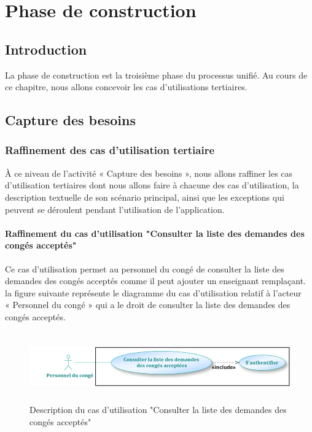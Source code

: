 \documentclass[12 pt]{report}
\begin{document}
\chapter{Phase de construction}
\section*{Introduction}  
La phase de construction est la troisième phase du processus unifié. Au cours de ce chapitre, nous allons concevoir les cas d’utilisations tertiaires.
\section{Capture des besoins}
\subsection{Raffinement des cas d’utilisation tertiaire}
À ce niveau de l’activité « Capture des besoins », nous allons raffiner les cas d'utilisation tertiaires dont nous allons faire à chacune des cas d'utilisation, la description textuelle de son scénario principal, ainsi que les exceptions qui peuvent se déroulent pendant l'utilisation de l’application.
\subsubsection{Raffinement du cas d'utilisation "Consulter la liste des demandes des congés acceptés"}
Ce cas d'utilisation permet au personnel du congé de consulter la liste des demandes des congés acceptés comme il peut ajouter un enseignant remplaçant.
\newpage
la figure suivante représente le diagramme du cas d’utilisation  relatif à l’acteur \\« Personnel du congé » qui a le droit de consulter la liste des demandes des congés acceptés.

\begin{figure}[h]
\begin{center}
\includegraphics[width= 13cm , height = 3cm]{seq_consulte_acce.png}
\caption{Description du cas d'utilisation "Consulter la liste des demandes des congés acceptés"}
\end{center}
\end{figure}
\end{document}
